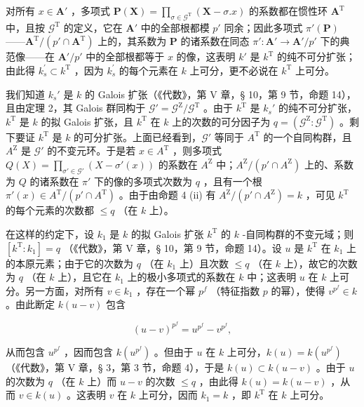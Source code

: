 对所有 \(x \in \mathbf{A}'\) ，多项式 \(\mathbf{P}(\mathbf{X}) = \prod_{\sigma \in \mathcal{G}^{\mathrm{T}}} (\mathbf{X} - \sigma.x)\) 的系数都在惯性环 \(\mathbf{A}^{\mathrm{T}}\) 中，且按 \(\mathcal{G}^{\mathrm{T}}\) 的定义，它在 \(\mathbf{A}'\) 中的全部根都模 \(p'\) 同余；因此多项式 \(\pi'(\mathbf{P})\) ——\(\mathbf{A}^{\mathrm{T}} / (p' \cap \mathbf{A}^{\mathrm{T}})\) 上的，其系数为 \(\mathbf{P}\) 的诸系数在同态 \(\pi': \mathbf{A}' \to \mathbf{A}' / p'\) 下的典范像——在 \(\mathbf{A}' / p'\) 中的全部根都等于 \(x\) 的像，这表明 \(k'\) 是 \(k^{\mathrm{T}}\) 的纯不可分扩张；由此得 \(k_{s}^{\prime} \subset k^{\mathrm{T}}\) ，因为 \(k_{s}^{\prime}\) 的每个元素在 \(k\) 上可分，更不必说在 \(k^{\mathrm{T}}\) 上可分。

我们知道 \(k_s'\) 是 \(k\) 的 Galois 扩张（《代数》，第 V 章，§ 10，第 9 节，命题 14），且由定理 2，其 Galois 群同构于 \(\mathcal{G}' = \mathcal{G}^{\mathrm{Z}} / \mathcal{G}^{\mathrm{T}}\) 。由于 \(k^{\mathrm{T}}\) 是 \(k_s'\) 的纯不可分扩张，\(k^{\mathrm{T}}\) 是 \(k\) 的拟 Galois 扩张，且 \(k^{\mathrm{T}}\) 在 \(k\) 上的次数的可分因子为 \(q = (\mathcal{G}^{\mathrm{Z}}: \mathcal{G}^{\mathrm{T}})\) 。剩下要证 \(k^{\mathrm{T}}\) 是 \(k\) 的可分扩张。上面已经看到，\(\mathcal{G}'\) 等同于 \(A^{\mathrm{T}}\) 的一个自同构群，且 \(A^{\mathrm{Z}}\) 是 \(\mathcal{G}'\) 的不变元环。于是若 \(x \in A^{\mathrm{T}}\) ，则多项式 \(Q(X) = \prod_{\sigma' \in \mathcal{G}'} (X - \sigma'(x))\) 的系数在 \(A^{\mathrm{Z}}\) 中；\(A^{\mathrm{Z}} / (p' \cap A^{\mathrm{Z}})\) 上的、系数为 \(Q\) 的诸系数在 \(\pi'\) 下的像的多项式次数为 \(q\) ，且有一个根 \(\pi'(x) \in A^{\mathrm{T}} / (p' \cap A^{\mathrm{T}})\) 。由于由命题 4 (ii) 有 \(A^{\mathrm{Z}} / (p' \cap A^{\mathrm{Z}}) = k\) ，可见 \(k^{\mathrm{T}}\) 的每个元素的次数都 \(\leqslant q\) （在 \(k\) 上）。

在这样的约定下，设 \(k_{1}\) 是 \(k\) 的拟 Galois 扩张 \(k^{\mathrm{T}}\) 的 \(k\) -自同构群的不变元域；则 \([k^{\mathrm{T}}:k_{1}] = q\) （《代数》，第 V 章，§ 10，第 9 节，命题 14）。设 \(u\) 是 \(k^{\mathrm{T}}\) 在 \(k_{1}\) 上的本原元素；由于它的次数为 \(q\) （在 \(k_{1}\) 上）且次数 \(\leqslant q\) （在 \(k\) 上），故它的次数为 \(q\) （在 \(k\) 上），且它在 \(k_{1}\) 上的极小多项式的系数在 \(k\) 中；这表明 \(u\) 在 \(k\) 上可分。另一方面，对所有 \(v \in k_{1}\) ，存在一个幂 \(p^{f}\) （特征指数 \(p\) 的幂），使得 \(v^{p^{f}} \in k\) 。由此断定 \(k(u - v)\) 包含

\[
(u - v)^{p^{f}} = u^{p^{f}} - v^{p^{f}},
\]

从而包含 \(u^{p^{f}}\) ，因而包含 \(k(u^{p^{f}})\) 。但由于 \(u\) 在 \(k\) 上可分，\(k(u) = k(u^{p^{f}})\) （《代数》，第 V 章，§ 3，第 3 节，命题 4），于是 \(k(u) \subset k(u - v)\) 。由于 \(u\) 的次数为 \(q\) （在 \(k\) 上）而 \(u - v\) 的次数 \(\leqslant q\) ，由此得 \(k(u) = k(u - v)\) ，从而 \(v \in k(u)\) 。这表明 \(v\) 在 \(k\) 上可分，因而 \(k_1 = k\) ，即 \(k^{\mathrm{T}}\) 在 \(k\) 上可分。

